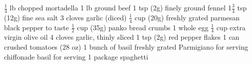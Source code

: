 \dishtype{}
\begin{ingreds}
    \ingredients[Meatballs]
        $\frac{1}{4}$ lb chopped mortadella
        1 lb ground beef
        1 tsp (2g) finely ground fennel
        1$\frac{3}{4}$ tsp (12g) fine sea salt
        3 cloves garlic (diced)
        $\frac{1}{4}$ cup (20g) freshly grated parmesan
        black pepper to taste
        $\frac{1}{2}$ cup (35g) panko bread crumbs
        1 whole egg
    \columnbreak{}
    \ingredients[Sauce]
        $\frac{1}{4}$ cup extra virgin olive oil
        4 cloves garlic, thinly sliced
        1 tsp (2g) red pepper flakes
        1 can crushed tomatoes (28 oz)
        1 bunch of basil
        freshly grated Parmigiano for serving
        chiffonade basil for serving
        1 package spaghetti
    
\end{ingreds}
